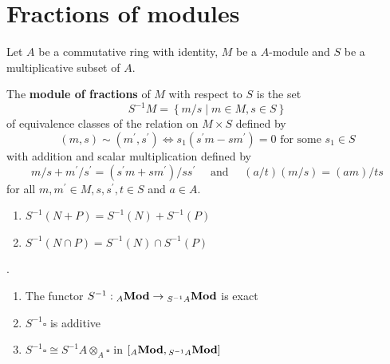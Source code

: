 \section{Fractions of modules} %
Let $A$ be a commutative ring with identity, $M$ be a $A$-module and $S$ be a multiplicative subset of $A$.
\begin{definition}
    The \textbf{module of fractions} of $M$ with respect to $S$ is the set
    \begin{equation*}
        S^{-1} M=\left\{m / s \mid m \in M, s \in S\right\}
    \end{equation*}
    of equivalence classes of the relation on $M \times S$ defined by
    \begin{equation*}
        (m, s) \sim\left(m^{\prime}, s^{\prime}\right) \Leftrightarrow s_1\left(s^{\prime} m-s m^{\prime}\right)=0 \text { for some } s_1 \in S
    \end{equation*}
    with addition and scalar multiplication defined by
    \begin{equation*}
        m / s+m^{\prime} / s^{\prime}=\left(s^{\prime} m+s m^{\prime}\right) / s s^{\prime} \quad \text { and } \quad(a / t)(m / s)=(a m) / t s
    \end{equation*}
    for all $m, m^{\prime} \in M, s, s^{\prime}, t \in S$ and $a \in A$.
\end{definition}


\begin{lemma}
    \begin{enumerate}
        \item
              $S^{-1}(N+P)=S^{-1}(N)+S^{-1}(P)$
        \item
              $S^{-1}(N \cap P)=S^{-1}(N) \cap S^{-1}(P)$
    \end{enumerate}
\end{lemma}

\begin{proposition}.
    \begin{enumerate}
        \item
              The functor $S^{-1}:{}_A\mathbf{Mod} \rightarrow {}_{S^{-1}A}\mathbf{Mod}$ is exact
        \item
              $S^{-1}\square$ is additive
        \item
              $S^{-1}\square\cong S^{-1}A\otimes_A\square$ in $\left[{}_A\mathbf{Mod},{}_{S^{-1} A}\mathbf{Mod}\right]$
    \end{enumerate}
\end{proposition}

